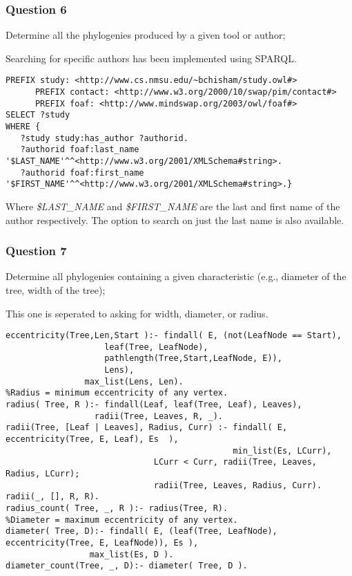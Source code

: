 \documentclass[10pt]{article}
\begin{document}
\subsubsection{Question 6}
 Determine all the phylogenies produced by a given tool or author;

Searching for specific authors has been implemented using SPARQL.

\begin{verbatim}
PREFIX study: <http://www.cs.nmsu.edu/~bchisham/study.owl#>
      PREFIX contact: <http://www.w3.org/2000/10/swap/pim/contact#>
      PREFIX foaf: <http://www.mindswap.org/2003/owl/foaf#>
SELECT ?study
WHERE {
   ?study study:has_author ?authorid.
   ?authorid foaf:last_name '$LAST_NAME'^^<http://www.w3.org/2001/XMLSchema#string>.
   ?authorid foaf:first_name '$FIRST_NAME'^^<http://www.w3.org/2001/XMLSchema#string>.}
\end{verbatim}

Where \emph{\$LAST\_NAME} and \emph{\$FIRST\_NAME} are the last and first name of the author respectively.  The option to search on just the last name is also available.

\subsubsection{Question 7}
Determine all phylogenies containing a given characteristic (e.g., diameter of the tree, width of the tree);

This one is seperated to asking for width, diameter, or radius.
\begin{verbatim}
eccentricity(Tree,Len,Start ):- findall( E, (not(LeafNode == Start),
					leaf(Tree, LeafNode), 
					pathlength(Tree,Start,LeafNode, E)), 
					Lens),
				max_list(Lens, Len).
%Radius = minimum eccentricity of any vertex.
radius( Tree, R ):- findall(Leaf, leaf(Tree, Leaf), Leaves),
	       	      radii(Tree, Leaves, R, _).
radii(Tree, [Leaf | Leaves], Radius, Curr) :- findall( E, eccentricity(Tree, E, Leaf), Es  ),
	                           		          min_list(Es, LCurr),
					          LCurr < Curr, radii(Tree, Leaves, Radius, LCurr);
					          radii(Tree, Leaves, Radius, Curr).
radii(_, [], R, R).
radius_count( Tree, _, R ):- radius(Tree, R).
%Diameter = maximum eccentricity of any vertex.
diameter( Tree, D):- findall( E, (leaf(Tree, LeafNode), eccentricity(Tree, E, LeafNode)), Es ), 
		         max_list(Es, D ).
diameter_count(Tree, _, D):- diameter( Tree, D ).
\end{verbatim}
\end{document}
